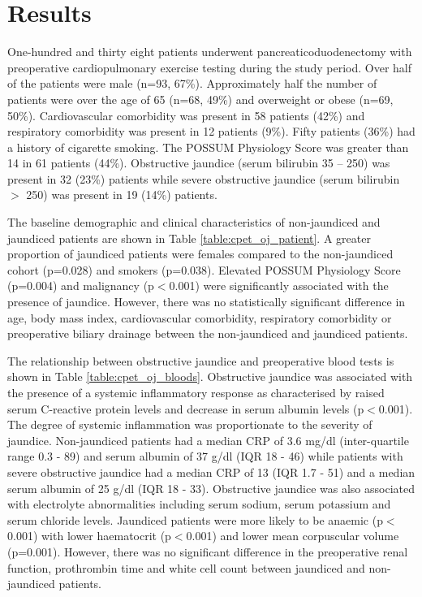 \section{Results}
One-hundred and thirty eight patients underwent pancreaticoduodenectomy with preoperative cardiopulmonary exercise testing during the study period. 
Over half of the patients were male (n=93, 67\%). 
Approximately half the number of patients were over the age of 65 (n=68, 49\%) and overweight or obese (n=69, 50\%). 
Cardiovascular comorbidity was present in 58 patients (42\%) and respiratory comorbidity was present in 12 patients (9\%). 
Fifty patients (36\%) had a history of cigarette smoking. 
The POSSUM Physiology Score was greater than 14 in 61 patients (44\%). 
Obstructive jaundice (serum bilirubin 35 – 250) was present in 32 (23\%) patients while severe obstructive jaundice (serum bilirubin $>$ 250) was present in 19 (14\%) patients. 

The baseline demographic and clinical characteristics of non-jaundiced and jaundiced patients are shown in Table \ref{table:cpet_oj_patient}. 
A greater proportion of jaundiced patients were females compared to the non-jaundiced cohort (p=0.028) and smokers (p=0.038). 
Elevated POSSUM Physiology Score (p=0.004) and malignancy (p$<$0.001) were significantly associated with the presence of jaundice. 
However, there was no statistically significant difference in age, body mass index, cardiovascular comorbidity, respiratory comorbidity or preoperative biliary drainage between the non-jaundiced and jaundiced patients.



The relationship between obstructive jaundice and preoperative blood tests is shown in Table \ref{table:cpet_oj_bloods}. 
Obstructive jaundice was associated with the presence of a systemic inflammatory response as characterised by raised serum C-reactive protein levels and decrease in serum albumin levels (p$<$0.001). 
The degree of systemic inflammation was proportionate to the severity of jaundice. 
Non-jaundiced patients had a median CRP of 3.6 mg/dl (inter-quartile range 0.3 - 89) and serum albumin of 37 g/dl (IQR 18 - 46) while patients with severe obstructive jaundice had a median CRP of 13 (IQR 1.7 - 51) and a median serum albumin of 25 g/dl (IQR 18 - 33). 
Obstructive jaundice was also associated with electrolyte abnormalities including serum sodium, serum potassium and serum chloride levels. 
Jaundiced patients were more likely to be anaemic (p$<$0.001) with lower haematocrit (p$<$0.001) and lower mean corpuscular volume (p=0.001). 
However, there was no significant difference in the preoperative renal function, prothrombin time and white cell count between jaundiced and non-jaundiced patients. 

